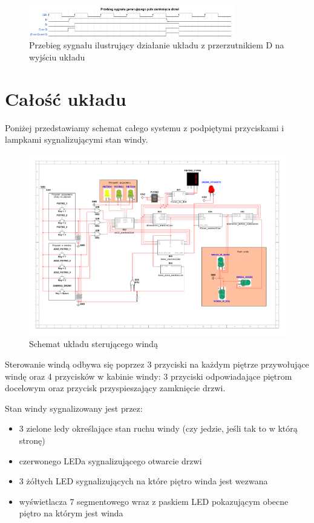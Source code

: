 \documentclass[a4paper]{article}
\begin{document}
\begin{figure}[H]
    \centering
    \includegraphics[width=0.8\textwidth]{output_waveform.pdf}
    \caption{Przebieg sygnału ilustrujący działanie układu z przerzutnikiem D na wyjściu układu}
\end{figure}

\pagebreak
\section{Całość układu}
Poniżej przedstawiamy schemat całego systemu z podpiętymi przyciskami i lampkami sygnalizującymi stan windy.
\begin{figure}[H]
    \centering
    \includegraphics[width=\textwidth]{elevator_system_schemat.pdf}
    \caption{Schemat układu sterującego windą}
\end{figure}
Sterowanie windą odbywa się poprzez 3 przyciski na każdym piętrze przywołujące windę oraz
4 przycisków w kabinie windy: 3 przyciski odpowiadające piętrom docelowym oraz przycisk przyspieszający
zamknięcie drzwi. 

Stan windy sygnalizowany jest przez:
\begin{itemize}
    \item 3 zielone ledy określające stan ruchu windy (czy jedzie, jeśli tak to
w którą stronę)
    \item czerwonego LEDa sygnalizującego otwarcie drzwi
    \item 3 żółtych LED sygnalizujących na które piętro winda jest wezwana
    \item wyświetlacza 7 segmentowego wraz z paskiem LED pokazującym obecne piętro na którym jest winda
\end{itemize}
\end{document}
